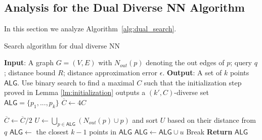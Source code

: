 \subsection{Analysis for the Dual Diverse NN Algorithm}\label{sec:dual-analysis}

In this section we analyze Algorithm~\ref{alg:dual_search}.

\begin{algorithm}
\caption{Search algorithm for dual diverse NN}
\label{alg:dual_search}
\begin{algorithmic}[1]
\STATE \textbf{Input}: A graph $G=(V,E)$ with $N_{out}(p)$ denoting the out edges of $p$; query $q$; distance bound $R$; distance approximation error $\epsilon$.
\STATE  \textbf{Output}: A set of $k$ points $\mathsf{ALG}$.
\STATE Use binary search to find a maximal $C$ such that the initialization step proved in Lemma \ref{lm:initialization} outputs a $(k',C)$-diverse set $\mathsf{ALG}=\{p_1,...,p_k\}$
\STATE $\overline{C}\gets 4C$

    \STATE  $\overline{C}\gets \overline{C}/2$
    \STATE  $U\gets \bigcup\limits_{p\in \mathsf{ALG}}(N_{out}(p)\cup p)$ and sort $U$ based on their distance from $q$   
    \STATE $\mathsf{ALG}\gets$ the closest $k-1$ points in $\mathsf{ALG}$
            \STATE $\mathsf{ALG}\gets \mathsf{ALG}\cup u$
            \STATE Break
        \ENDIF
    \ENDFOR
    \ENDFOR
\ENDWHILE
\STATE \textbf{Return} $\mathsf{ALG}$
\end{algorithmic}
\end{algorithm}



